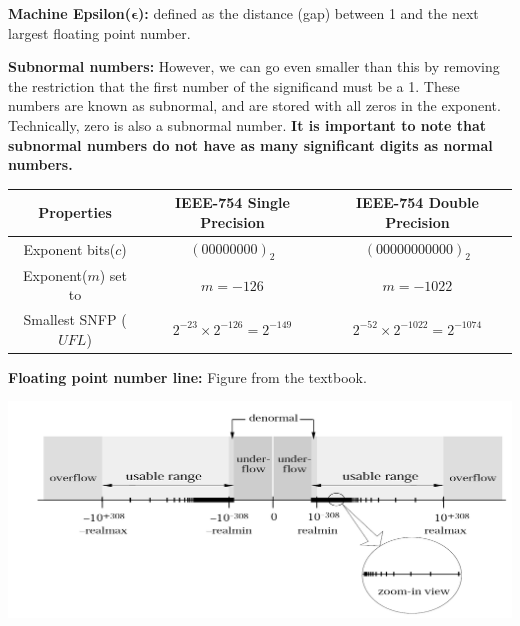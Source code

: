 \documentclass[12pt]{article}
\begin{document}
\medskip
\noindent \textbf{Machine Epsilon($\boldsymbol{\epsilon}$):} defined as the distance (gap) between 1 and the next largest floating point number.

\medskip
\noindent\textbf{Subnormal numbers:} However, we can go even smaller than this by removing the restriction that the first number of the significand must be a 1. These numbers are known as subnormal, and are stored with all zeros in the exponent. Technically, zero is also a subnormal number. \textbf{It is important to note that subnormal numbers do not have as many significant digits as normal numbers.}
\begin{center} \renewcommand\arraystretch{2}
        \begin{tabular}{|c|c|c|}
        \hline
           \textbf{Properties} & \textbf{IEEE-754 Single Precision} & \textbf{IEEE-754 Double Precision} \\
           \hline
           Exponent bits($c$) & $(00000000)_2$ & $(00000000000)_2$\\
           \hline
           Exponent($m$) set to & $m = -126$ & $m = -1022$\\
           \hline
           Smallest SNFP ($UFL$) & $2^{-23} \times 2^{-126} = 2^{-149}$ & $2^{-52} \times 2^{-1022} = 2^{-1074}$\\
           \hline
        \end{tabular}
    \end{center}

\medskip
\noindent \textbf{Floating point number line:} Figure from the textbook.
    \begin{center}
        \includegraphics[width=.75\linewidth]{floatingpoints.png}
    \end{center}
\end{document}
